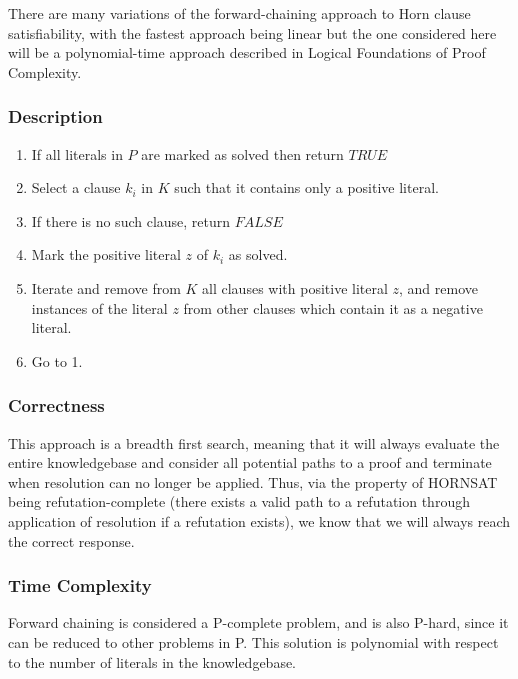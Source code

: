 \documentclass{article}
\begin{document}
There are many variations of the forward-chaining approach to Horn clause
satisfiability, with the fastest approach being linear\cite{linforward} but the 
one considered here will be a polynomial-time approach described in Logical 
Foundations of Proof Complexity.\cite{proofcomp}

\subsubsection{Description}

\begin{enumerate}
  \item If all literals in $P$ are marked as solved then return $TRUE$
  \item Select a clause $k_i$ in $K$ such that it contains only a positive
  literal.
  \item If there is no such clause, return $FALSE$
  \item Mark the positive literal $z$ of $k_i$ as solved.
  \item Iterate and remove from $K$ all clauses with positive literal $z$, and
  remove instances of the literal $z$ from other clauses which contain it as a
  negative literal.
  \item Go to 1.
\end{enumerate}

\subsubsection{Correctness}

This approach is a breadth first search, meaning that it will always evaluate
the entire knowledgebase and consider all potential paths to a proof and
terminate when resolution can no longer be applied. Thus, via the property 
of HORNSAT being refutation-complete (there exists a valid path to
a refutation through application of resolution if a refutation exists), we know 
that we will always reach the correct response.\cite{proofcomp}

\subsubsection{Time Complexity}

Forward chaining is considered a P-complete problem, and is also P-hard, since it 
can be reduced to other problems in P.\cite{proofcomp} This solution is
polynomial with respect to the number of literals in the
knowledgebase.\cite{proofcomp}\cite{krr}
\end{document}
